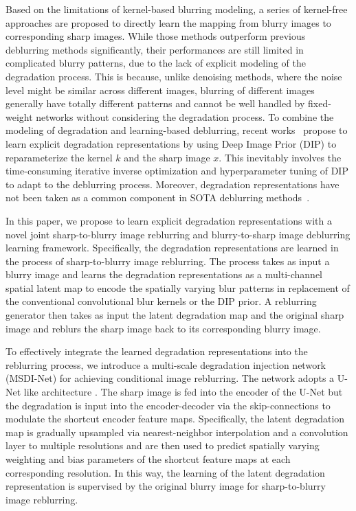 \documentclass[runningheads]{llncs}
\begin{document}
Based on the limitations of kernel-based blurring modeling, a series of kernel-free approaches \cite{gao2019dynamic,tao2018srndeblur,HINet,Zamir2021MPRNet,MIMO_UNet} are proposed to directly learn the mapping from blurry images to corresponding sharp images. While those methods outperform previous deblurring methods significantly, their performances are still limited in complicated blurry patterns, due to the lack of explicit modeling of the degradation process. This is because, unlike denoising methods, where the noise level might be similar across different images, blurring of different images generally have totally different patterns and cannot be well handled by fixed-weight networks without considering the degradation process.
To combine the modeling of degradation and learning-based deblurring, recent works~\cite{Exploring_blur-CVPR21,Blind_DIP} propose to learn explicit degradation representations by using Deep Image Prior (DIP) \cite{DIP_2018_CVPR} to reparameterize the kernel $k$ and the sharp image $x$.
This inevitably involves the time-consuming iterative inverse optimization and hyperparameter tuning of DIP to adapt to the deblurring process.
Moreover, degradation representations have not been taken as a common component in SOTA deblurring methods~\cite{HINet,Zamir2021MPRNet}.

In this paper, we propose to learn explicit degradation representations with a novel joint sharp-to-blurry image reblurring and blurry-to-sharp image deblurring learning framework. 
Specifically, the degradation representations are learned in the process of sharp-to-blurry image reblurring. The process takes as input a blurry image and learns the degradation representations as a multi-channel spatial latent map to encode the spatially varying blur patterns in replacement of the conventional convolutional blur kernels or the DIP prior. 
A reblurring generator then takes as input the latent degradation map and the original sharp image and reblurs the sharp image back to its corresponding blurry image.

To effectively integrate the learned degradation representations into the reblurring process, we introduce a multi-scale degradation injection network (MSDI-Net) for achieving conditional image reblurring. 
The network adopts a U-Net like architecture \cite{U-Net}. The sharp image is fed into the encoder of the U-Net but the
degradation is input into the encoder-decoder via the skip-connections to modulate the shortcut encoder feature maps. Specifically, the latent degradation map
is gradually upsampled via nearest-neighbor interpolation and a convolution layer to multiple resolutions and are then used to predict spatially varying weighting and bias parameters of the shortcut feature maps at each corresponding resolution.
In this way, the learning of the latent degradation representation is supervised by the original blurry image for sharp-to-blurry image reblurring.
\end{document}
